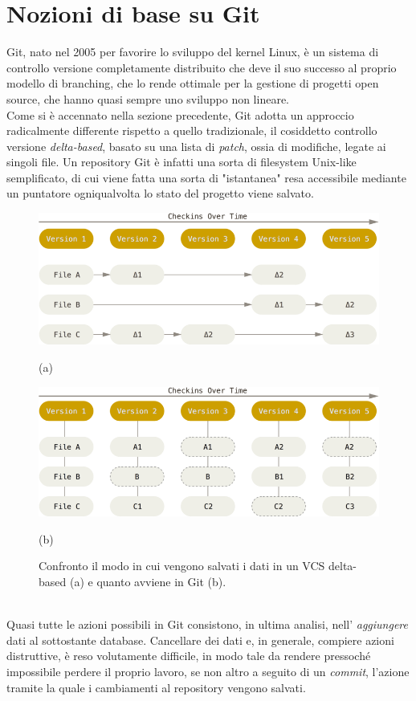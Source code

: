 \documentclass[12pt]{article}
\begin{document}
\section{Nozioni di base su Git}
Git, nato nel 2005 per favorire lo sviluppo del kernel Linux, è un sistema di controllo versione completamente distribuito che deve il suo successo al proprio modello di branching, che lo rende ottimale per la gestione di progetti open source, che hanno quasi sempre uno sviluppo non lineare.
\bigskip \\
Come si è accennato nella sezione precedente, Git adotta un approccio radicalmente differente rispetto a quello tradizionale, il cosiddetto controllo versione \textit{delta-based}, basato su una lista di \textit{patch}, ossia di modifiche, legate ai singoli file. Un repository Git è infatti una sorta di filesystem Unix-like semplificato, di cui viene fatta una sorta di "istantanea" resa accessibile mediante un puntatore ogniqualvolta lo stato del progetto viene salvato.
\begin{figure}[h]
	\centering
	\includegraphics[width=13cm]{delta-based.png}
	\caption*{(a)\bigskip}
	\includegraphics[width=13cm]{snapshots-based.png}
	\caption*{(b)}
	\caption{Confronto il modo in cui vengono salvati i dati in un VCS delta-based (a) e quanto avviene in Git (b).}
\end{figure}
\bigskip \\
Quasi tutte le azioni possibili in Git consistono, in ultima analisi, nell' \textit{aggiungere} dati al sottostante database. Cancellare dei dati e, in generale, compiere azioni distruttive, è reso volutamente difficile, in modo tale da rendere pressoché impossibile perdere il proprio lavoro, se non altro a seguito di un \textit{commit}, l'azione tramite la quale i cambiamenti al repository vengono salvati.
\end{document}
